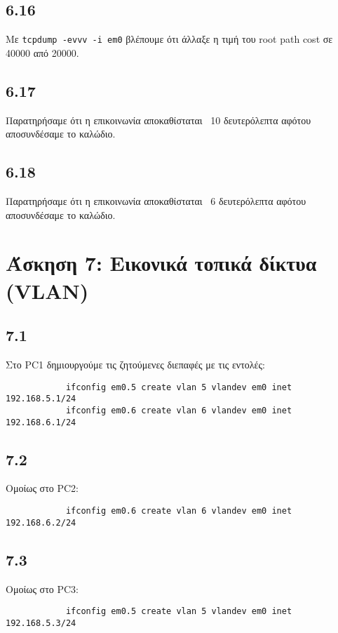 \documentclass[a4paper, 12pt]{article}
\begin{document}
	\subsection*{6.16}
		Mε \verb|tcpdump -evvv -i em0| βλέπουμε ότι άλλαξε η τιμή του root path cost σε 40000 από 20000.

	\subsection*{6.17}
		Παρατηρήσαμε ότι η επικοινωνία αποκαθίσταται ~10 δευτερόλεπτα αφότου αποσυνδέσαμε το καλώδιο.

	\subsection*{6.18}
		Παρατηρήσαμε ότι η επικοινωνία αποκαθίσταται ~6 δευτερόλεπτα αφότου αποσυνδέσαμε το καλώδιο.

\section*{Άσκηση 7: Εικονικά τοπικά δίκτυα (VLAN)}

	\subsection*{7.1}
		Στο PC1 δημιουργούμε τις ζητούμενες διεπαφές με τις εντολές:
		
		\begin{verbatim}
			ifconfig em0.5 create vlan 5 vlandev em0 inet 192.168.5.1/24
			ifconfig em0.6 create vlan 6 vlandev em0 inet 192.168.6.1/24
		\end{verbatim}

	\subsection*{7.2}
		Ομοίως στο PC2:
		
		\begin{verbatim}
			ifconfig em0.6 create vlan 6 vlandev em0 inet 192.168.6.2/24
		\end{verbatim}

	\subsection*{7.3}
		Ομοίως στο PC3:
		
		\begin{verbatim}
			ifconfig em0.5 create vlan 5 vlandev em0 inet 192.168.5.3/24
		\end{verbatim}
\end{document}
